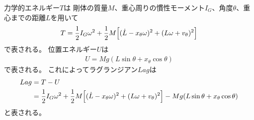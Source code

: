 \documentclass[a4paper,11pt]{jsarticle}
\begin{document}
力学的エネルギー$T$は
剛体の質量$M$、重心周りの慣性モーメント$I_G$、角度$\theta$、重心までの距離$L$を用いて
\begin{align*}
  T = 
  \frac{1}{2}I_G\omega^2
  + \frac{1}{2}M
  \Bigl[ (\dot{L} - x_\theta \omega)^2 + (L\omega + v_\theta)^2 \Bigr]
\end{align*}
で表される。
位置エネルギー$U$は
\begin{align*}
  U = Mg ( L\sin\theta + x_\theta \cos\theta )
\end{align*}
で表される。
これによってラグランジアン$Lag$は
\begin{align*}
  Lag &=
  T - U
  \\
  &= 
  \frac{1}{2}I_G\omega^2
  + \frac{1}{2}M
  \Bigl[ (\dot{L} - x_\theta \omega)^2 + (L\omega + v_\theta)^2 \Bigr]
  - Mg ( L\sin\theta + x_\theta \cos\theta )
\end{align*}
と表される。
\end{document}
